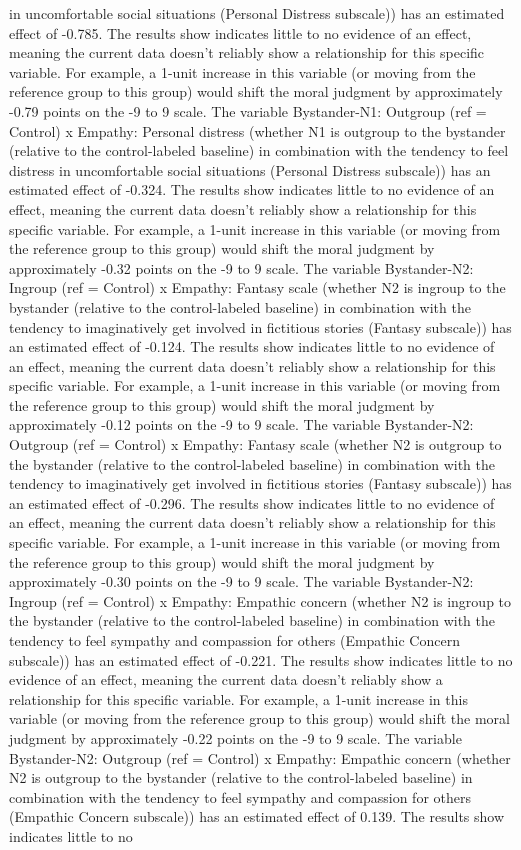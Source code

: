 \documentclass[11pt]{article}
\begin{document}
in uncomfortable social situations (Personal Distress subscale)) has an estimated effect of -0.785. The results show indicates little to no evidence of an effect, meaning the current data doesn't reliably show a relationship for this specific variable. For example, a 1-unit increase in this variable (or moving from the reference group to this group) would shift the moral judgment by approximately -0.79 points on the -9 to 9 scale. The variable Bystander-N1: Outgroup (ref = Control) x Empathy: Personal distress (whether N1 is outgroup to the bystander (relative to the control-labeled baseline) in combination with the tendency to feel distress in uncomfortable social situations (Personal Distress subscale)) has an estimated effect of -0.324. The results show indicates little to no evidence of an effect, meaning the current data doesn't reliably show a relationship for this specific variable. For example, a 1-unit increase in this variable (or moving from the reference group to this group) would shift the moral judgment by approximately -0.32 points on the -9 to 9 scale. The variable Bystander-N2: Ingroup (ref = Control) x Empathy: Fantasy scale (whether N2 is ingroup to the bystander (relative to the control-labeled baseline) in combination with the tendency to imaginatively get involved in fictitious stories (Fantasy subscale)) has an estimated effect of -0.124. The results show indicates little to no evidence of an effect, meaning the current data doesn't reliably show a relationship for this specific variable. For example, a 1-unit increase in this variable (or moving from the reference group to this group) would shift the moral judgment by approximately -0.12 points on the -9 to 9 scale. The variable Bystander-N2: Outgroup (ref = Control) x Empathy: Fantasy scale (whether N2 is outgroup to the bystander (relative to the control-labeled baseline) in combination with the tendency to imaginatively get involved in fictitious stories (Fantasy subscale)) has an estimated effect of -0.296. The results show indicates little to no evidence of an effect, meaning the current data doesn't reliably show a relationship for this specific variable. For example, a 1-unit increase in this variable (or moving from the reference group to this group) would shift the moral judgment by approximately -0.30 points on the -9 to 9 scale. The variable Bystander-N2: Ingroup (ref = Control) x Empathy: Empathic concern (whether N2 is ingroup to the bystander (relative to the control-labeled baseline) in combination with the tendency to feel sympathy and compassion for others (Empathic Concern subscale)) has an estimated effect of -0.221. The results show indicates little to no evidence of an effect, meaning the current data doesn't reliably show a relationship for this specific variable. For example, a 1-unit increase in this variable (or moving from the reference group to this group) would shift the moral judgment by approximately -0.22 points on the -9 to 9 scale. The variable Bystander-N2: Outgroup (ref = Control) x Empathy: Empathic concern (whether N2 is outgroup to the bystander (relative to the control-labeled baseline) in combination with the tendency to feel sympathy and compassion for others (Empathic Concern subscale)) has an estimated effect of 0.139. The results show indicates little to no 
\end{document}
